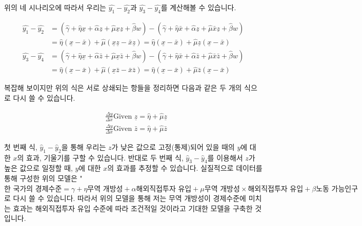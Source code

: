 \documentclass[
]{book}
\begin{document}
위의 네 시나리오에 따라서 우리는 \(\hat{y_1} - \hat{y_2}\)과 \(\hat{y_3}-\hat{y_4}\)를 계산해볼 수 있습니다.

\begin{equation*}
\begin{aligned}
\hat{y_1} - \hat{y_2}& = (\hat{\gamma} + \hat{\eta} \underline{x} + \hat{\alpha} \underline{z} + \hat{\mu} \underline{x}\underline{z} + \hat{\beta} w) - (\hat{\gamma} + \hat{\eta} \bar{x} + \hat{\alpha} \underline{z} + \hat{\mu} \bar{x}\underline{z} + \hat{\beta} w)\\
& = \hat{\eta}(\underline{x} - \bar{x}) + \hat{\mu}(\underline{x}\underline{z} - \bar{x}\underline{z}) = \hat{\eta}(\underline{x} - \bar{x}) + \hat{\mu}\underline{z}(\underline{x} - \bar{x})\\
\hat{y_3} - \hat{y_4}& = (\hat{\gamma} + \hat{\eta} \underline{x} + \hat{\alpha} \bar{z} + \hat{\mu} \underline{x}\bar{z} + \hat{\beta} w) - (\hat{\gamma} + \hat{\eta} \bar{x} + \hat{\alpha} \bar{z} + \hat{\mu} \bar{x}\bar{z} + \hat{\beta} w)\\
& = \hat{\eta}(\underline{x} - \bar{x}) + \hat{\mu}(\underline{x}\bar{z} - \bar{x}\bar{z}) = \hat{\eta}(\underline{x} - \bar{x}) + \hat{\mu}\bar{z}(\underline{x} - \bar{x})
\end{aligned}
\end{equation*}

복잡해 보이지만 위의 식은 서로 상쇄되는 항들을 정리하면 다음과 같은 두 개의 식으로 다시 쓸 수 있습니다.

\begin{equation*}
\begin{aligned}
&\frac{\Delta y}{\Delta x} \text{Given $\underline{z}$} = \hat{\eta} + \hat{\mu}\underline{z}\\
&\frac{\Delta y}{\Delta x} \text{Given $\bar{z}$} = \hat{\eta} + \hat{\mu}\bar{z}
\end{aligned}
\end{equation*}

첫 번째 식, \(\hat{y}_1 - \hat{y}_2\)을 통해 우리는 \(z\)가 낮은 값으로 고정(통제)되어 있을 때의 \(y\)에 대한 \(x\)의 효과, 기울기를 구할 수 있습니다. 반대로 두 번째 식, \(\hat{y}_3 - \hat{y}_4\)를 이용해서 \(z\)가 높은 값으로 일정할 때, \(y\)에 대한 \(x\)의 효과를 추정할 수 있습니다. 실질적으로 데이터를 통해 구성한 위의 모델은 "\(\text{한 국가의 경제수준} = \gamma + \eta \text{무역 개방성} + \alpha \text{해외직접투자 유입} + \mu \text{무역 개방성}\times\text{해외직접투자 유입} + \beta \text{노동 가능인구}\)로 다시 쓸 수 있습니다. 따라서 위의 모델을 통해 저는 무역 개방성이 경제수준에 미치는 효과는 해외직접투자 유입 수준에 따라 조건적일 것이라고 기대한 모델을 구축한 것입니다.
\end{document}

